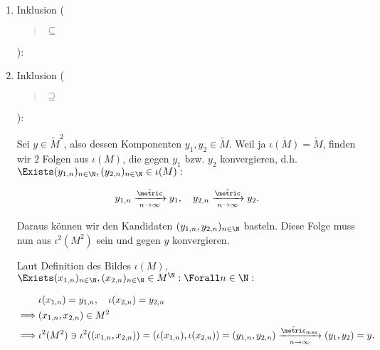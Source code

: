 \begin{solution}
\begin{enumerate}[label = \arabic*.]
\begin{enumerate}[label = 2.\arabic*.]
        \begin{enumerate}[label = \arabic*.]

            \item Inklusion (\blockquote{$\subseteq$}):

            \item Inklusion (\blockquote{$\supseteq$}):
            
            Sei $y \in \tilde M^2$, also dessen Komponenten $y_1, y_2 \in \tilde M$.
            Weil ja $\overline{\iota(M)} = \tilde M$, finden wir $2$ Folgen aus $\iota(M)$, die gegen $y_1$ bzw. $y_2$ konvergieren, d.h. $\Exists (y_{1, n})_{n \in \N}, (y_{2, n})_{n \in \N} \in \iota(M):$

            \begin{align*}
                y_{1, n} \xrightarrow[n \to \infty]{\tilde \metric} y_1,
                \quad
                y_{2, n} \xrightarrow[n \to \infty]{\tilde \metric} y_2.
            \end{align*}

            Daraus können wir den Kandidaten $(y_{1, n}, y_{2, n})_{n \in \N}$ basteln.
            Diese Folge muss nun aus $\iota^2(M^2)$ sein und gegen $y$ konvergieren.
            
            Laut Definition des Bildes $\iota(M)$, $\Exists (x_{1, n})_{n \in \N}, (x_{2, n})_{n \in \N} \in M^\N: \Forall n \in \N:$

            \begin{align*}
                & \iota(x_{1, n}) = y_{1, n},
                \quad
                \iota(x_{2, n}) = y_{2, n} \\
                \implies
                & (x_{1, n}, x_{2, n}) \in M^2 \\
                \implies
                & \iota^2(M^2)
                \ni
                \iota^2((x_{1, n}, x_{2, n}))
                =
                (
                    \iota(x_{1, n}),
                    \iota(x_{2, n})
                )
                =
                (y_{1, n}, y_{2, n})
                \xrightarrow[n \to \infty]{\tilde \metric_{\max}}
                (y_1, y_2)
                =
                y.
            \end{align*}

        \end{enumerate}

    \end{enumerate}

\end{enumerate}

\end{solution}

